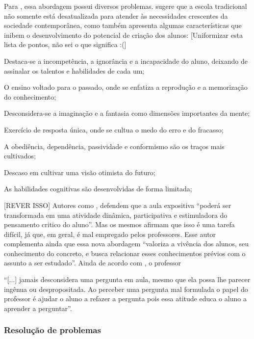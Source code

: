Para , essa abordagem possui diversos problemas.  sugere que a escola tradicional não somente está desatualizada para atender às necessidades 
crescentes da sociedade contemporânea, como também apresenta algumas características que inibem o desenvolvimento do potencial de criação dos alunos:
[Uniformizar esta lista de pontos, n\~ao sei o que significa :(]
\begin{alineascomponto}
\item Destaca-se a incompetência, a ignorância e a incapacidade do aluno, deixando de assinalar os talentos e habilidades de cada um; 
\item O ensino voltado para o passado, onde se enfatiza a reprodução e a memorização do conhecimento;
\item Desconsidera-se a imaginação e a fantasia como dimensões importantes da mente;
\item Exercício de resposta única, onde se cultua o medo do erro e do fracasso;
\item A obediência, dependência, passividade e conformismo são os traços mais cultivados;
\item Descaso em cultivar uma visão otimista do futuro;
\item As habilidades cognitivas são desenvolvidas de forma limitada;
\end{alineascomponto}

[REVER ISSO]
Autores como , defendem que a aula expositiva ``poderá ser transformada em uma atividade dinâmica, participativa e estimuladora do pensamento critico do aluno''. 
Mas os mesmos afirmam que isso é uma tarefa difícil, já que, em geral, é mal empregado pelos professores. Esse autor complementa ainda que essa nova abordagem ``valoriza a vivência dos alunos, seu 
conhecimento do concreto, e busca relacionar esses conhecimentos prévios com o assunto a ser estudado''. Ainda de acordo com , o professor

\begin{citacao}
``[...] jamais desconsidera uma pergunta em aula, mesmo que ela possa lhe parecer ingênua ou despropositada. Ao perceber uma pergunta mal formulada o papel do professor é ajudar o aluno a refazer a pergunta pois essa atitude educa o aluno a aprender a perguntar''.
\end{citacao}

\subsubsection{Resolução de problemas}

